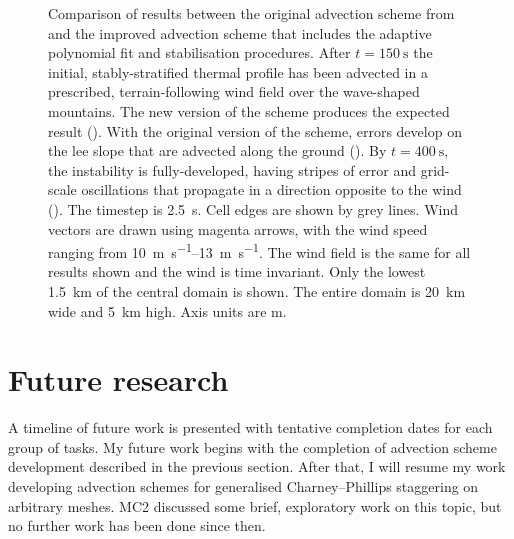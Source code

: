 \documentclass[a4paper,11pt]{article}
\begin{document}
\begin{figure}
%
	\caption{Comparison of results between the original advection scheme from \citet{weller-shahrokhi2014} and the improved advection scheme that includes the adaptive polynomial fit and stabilisation procedures.  After $t = \SI{150}{\second}$ the initial, stably-stratified thermal profile has been advected in a prescribed, terrain-following wind field over the wave-shaped mountains.  The new version of the scheme produces the expected result ().  With the original version of the scheme, errors develop on the lee slope that are advected along the ground ().
By $t = \SI{400}{\second}$, the instability is fully-developed, having stripes of error and grid-scale oscillations that propagate in a direction opposite to the wind ().
The timestep is \SI{2.5}{\second}.
Cell edges are shown by grey lines.  Wind vectors are drawn using magenta arrows, with the wind speed ranging from \SIrange{10}{13}{\meter\per\second}.  The wind field is the same for all results shown and the wind is time invariant.  Only the lowest \SI{1.5}{\kilo\meter} of the central domain is shown.  The entire domain is \SI{20}{\kilo\meter} wide and \SI{5}{\kilo\meter} high.  Axis units are \si{\meter}.}
\label{fig:instability}
\end{figure}

\section{Future research}
\label{sec:future}
A timeline of future work is presented with tentative completion dates for each group of tasks.
My future work begins with the completion of advection scheme development described in the previous section.  After that, I will resume my work developing advection schemes for generalised Charney--Phillips staggering on arbitrary meshes.
MC2 discussed some brief, exploratory work on this topic, but no further work has been done since then.
\end{document}
